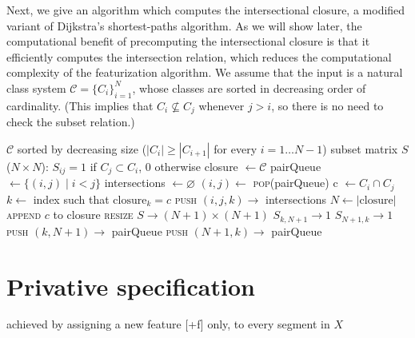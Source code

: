 \documentclass[11pt, oneside]{article}   	%
\begin{document}
\vspace{\baselineskip} Next, we give an algorithm which computes the intersectional closure, a modified variant of Dijkstra's shortest-paths algorithm. As we will show later, the computational benefit of precomputing the intersectional closure is that it efficiently computes the intersection relation, which reduces the computational complexity of the featurization algorithm. We assume that the input is a natural class system $\mathcal C = \{C_i\}_{i=1}^N$, whose classes are sorted in decreasing order of cardinality. (This implies that $C_i \nsubseteq C_j$ whenever $j > i$, so there is no need to check the subset relation.)

\vspace{\baselineskip} \noindent \begin{algorithmic}
    \REQUIRE $\mathcal C$ sorted by decreasing size ($|C_i| \geq |C_{i+1}| $ for every $i = 1 \ldots N-1$)
    \REQUIRE subset matrix $S$ ($N \times N$): $S_{ij} = 1$ if $C_j \subset C_i$, $0$ otherwise
    \STATE
    \STATE closure $\leftarrow \mathcal C$
    \STATE pairQueue $\leftarrow \{ (i, j) \; | \; i < j \}$
    \STATE intersections $\leftarrow \varnothing$
    \STATE
        \STATE $(i, j) \leftarrow$ \textsc{pop}(pairQueue)
            \STATE c $\leftarrow C_i \cap C_j$
                \STATE $k \leftarrow$ index such that $\text{closure}_k = c$
                \STATE \textsc{push} $(i, j, k) \rightarrow$ intersections
                \STATE $N \leftarrow |\text{closure}|$
                \STATE \textsc{append} $c$ to closure
                \STATE \textsc{resize} $S \rightarrow (N+1) \times (N+1)$
                        \STATE $S_{k,N+1} \rightarrow 1$
                    \ENDIF
                     \STATE $S_{N+1,k} \rightarrow 1$ \ENDIF
                    \STATE \textsc{push} $(k, N+1) \rightarrow$ pairQueue
                    \STATE \textsc{push} $(N+1,k) \rightarrow$ pairQueue
                \ENDFOR
            \ENDIF
        \ENDIF
    \ENDWHILE
\end{algorithmic}

\section{Privative specification}
achieved by assigning a new feature [+f] only, to every segment in $X$
\end{document}
